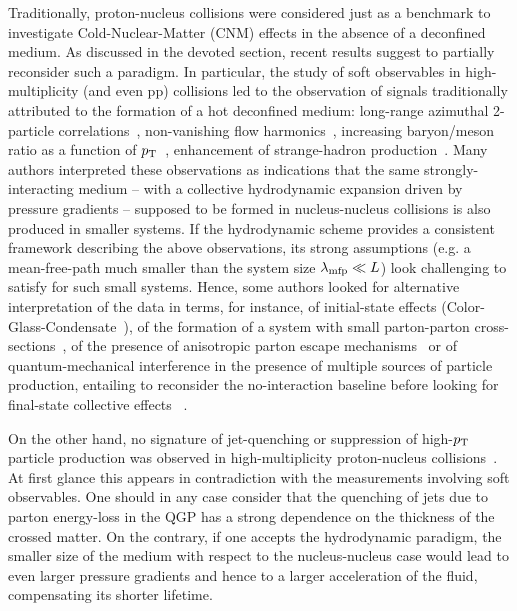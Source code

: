 Traditionally, proton-nucleus collisions were considered just as a benchmark to investigate Cold-Nuclear-Matter (CNM) effects in the absence of a deconfined medium. As discussed in the devoted section, recent results suggest to partially reconsider such a paradigm. 
In particular, the study of soft observables in high-multiplicity \pPb (and even pp) collisions led to the observation of signals traditionally attributed to the formation of a hot deconfined medium: long-range azimuthal 2-particle correlations~\cite{Khachatryan:2010gv,CMS:2012qk,Abelev:2012ola,Aad:2012gla}, non-vanishing flow harmonics~\cite{ABELEV:2013wsa,Khachatryan:2015waa}, increasing baryon/meson ratio as a function of $p\sb{\scriptstyle\mathrm{T}}$~\cite{Abelev:2013haa}, enhancement of strange-hadron production~\cite{Adam:2015vsf}. Many authors interpreted these observations as indications that the same strongly-interacting medium -- with a collective hydrodynamic expansion driven by pressure gradients -- supposed to be formed in nucleus-nucleus collisions is also produced in smaller systems. If the hydrodynamic scheme provides a consistent framework describing the above observations, its strong assumptions (e.g. a mean-free-path much smaller than the system size $\lambda_{\rm mfp}\ll L$) look challenging to satisfy for such small systems. Hence, some authors looked for alternative interpretation of the data in terms, for instance, of initial-state effects (Color-Glass-Condensate~\cite{Dusling:2013qoz}), of the formation of a system with small parton-parton cross-sections~\cite{Bzdak:2014dia}, of the presence of anisotropic parton escape mechanisms~\cite{HE2016506} or of quantum-mechanical interference in the presence of multiple sources of particle production, entailing to reconsider the no-interaction baseline before looking for final-state collective effects~\cite{Blok:2017pui} .

On the other hand, no signature of jet-quenching or suppression of high-$p\sb{\scriptstyle\mathrm{T}}$ particle production was observed in high-multiplicity proton-nucleus collisions~\cite{Acharya:2018qsh}.  At first glance this appears in contradiction with the measurements involving soft observables. One should in any case consider that the quenching of jets due to parton energy-loss in the QGP has a strong dependence on the thickness of the crossed matter.
On the contrary, if one accepts the hydrodynamic paradigm, the smaller size of the medium with respect to the nucleus-nucleus case would lead to even larger pressure gradients and hence to a larger acceleration of the fluid, compensating its shorter lifetime.

